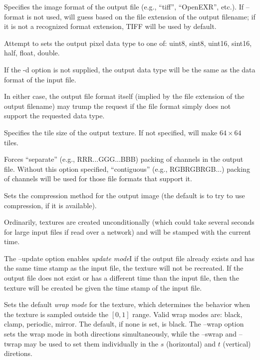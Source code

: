 Specifies the image format of the output file (e.g., ``tiff'',
``OpenEXR'', etc.).  If {\cf --format} is not used, \maketx will 
guess based on the file extension of the output filename; if it
is not a recognized format extension, TIFF will be used by default.
\apiend

Attempt to sets the output pixel data type to one of: {\cf uint8}, 
{\cf sint8}, {\cf uint16}, {\cf sint16}, {\cf half}, {\cf float}, 
{\cf double}.

If the {\cf -d} option is not supplied, the output data type will
be the same as the data format of the input file.

In either case, the output file format itself (implied by the file
extension of the output filename) may trump the request if the file
format simply does not support the requested data type.
\apiend

Specifies the tile size of the output texture.  If not specified,
\maketx will make $64 \times 64$ tiles.
\apiend

Forces ``separate'' (e.g., RRR...GGG...BBB) packing of channels in the
output file.  Without this option specified, ``contiguous'' (e.g.,
RGBRGBRGB...) packing of channels will be used for those file formats
that support it.
\apiend

Sets the compression method for the output image (the default is to try
to use  compression, if it is available).
\apiend

Ordinarily, textures are created unconditionally (which could take
several seconds for large input files if read over a network) and will
be stamped with the current time.

The {\cf --update} option enables \emph{update mode}I if the output file
already exists and has the same time stamp as the input file, the
texture will not be recreated.  If the output file does not exist or has
a different time than the input file, then the texture will be created
be given the time stamp of the input file.
\apiend

Sets the default \emph{wrap mode} for the texture, which determines
the behavior when the texture is sampled outside the $[0,1]$ range.
Valid wrap modes are: {\cf black}, {\cf clamp}, {\cf periodic},
{\cf mirror}.  The default, if none is set, is {\cf black}.  The
{\cf --wrap} option sets the wrap mode in both directions
simultaneously, while the {\cf --swrap} and {\cf --twrap} may be used to
set them individually in the $s$ (horizontal) and $t$ (vertical)
diretions.

